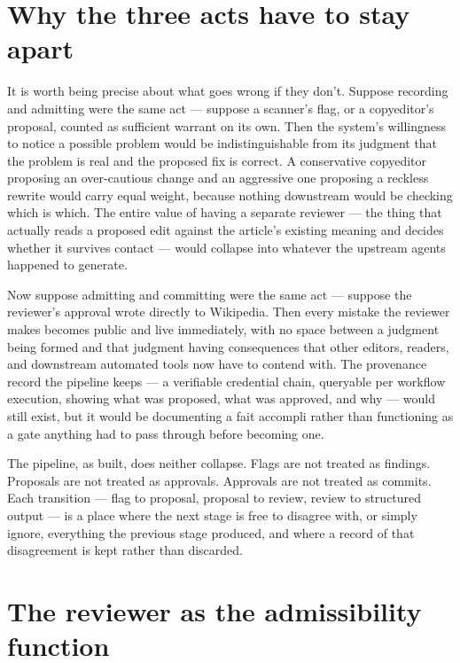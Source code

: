 \documentclass[11pt,openany]{book}
\begin{document}
\section{Why the three acts have to stay apart}

It is worth being precise about what goes wrong if they don't. Suppose recording and admitting were the same act — suppose a scanner's flag, or a copyeditor's proposal, counted as sufficient warrant on its own. Then the system's willingness to notice a possible problem would be indistinguishable from its judgment that the problem is real and the proposed fix is correct. A conservative copyeditor proposing an over-cautious change and an aggressive one proposing a reckless rewrite would carry equal weight, because nothing downstream would be checking which is which. The entire value of having a separate reviewer — the thing that actually reads a proposed edit against the article's existing meaning and decides whether it survives contact — would collapse into whatever the upstream agents happened to generate.

Now suppose admitting and committing were the same act — suppose the reviewer's approval wrote directly to Wikipedia. Then every mistake the reviewer makes becomes public and live immediately, with no space between a judgment being formed and that judgment having consequences that other editors, readers, and downstream automated tools now have to contend with. The provenance record the pipeline keeps — a verifiable credential chain, queryable per workflow execution, showing what was proposed, what was approved, and why — would still exist, but it would be documenting a fait accompli rather than functioning as a gate anything had to pass through before becoming one.

The pipeline, as built, does neither collapse. Flags are not treated as findings. Proposals are not treated as approvals. Approvals are not treated as commits. Each transition — flag to proposal, proposal to review, review to structured output — is a place where the next stage is free to disagree with, or simply ignore, everything the previous stage produced, and where a record of that disagreement is kept rather than discarded.

\section{The reviewer as the admissibility function}
\end{document}

